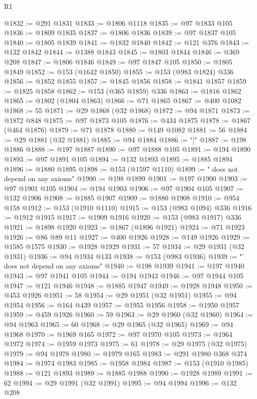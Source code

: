 \begin{lexlean}{R1}
\begin{coremodule}
@1832 := @291 @1831
@1833 := @1806 @1118
@1835 := @97 @1833 @105
@1836 := @1809 @1835
@1837 := @1806 @1836
@1839 := @97 @1837 @105
@1840 := @1805 @1839
@1841 := @1832 @1840
@1842 := @121 @376
@1843 := @132 @1842
@1844 := @1388 @1843
@1845 := @1803 @1844
@1846 := @369 @208
@1847 := @1806 @1846
@1849 := @97 @1847 @105
@1850 := @1805 @1849
@1852 := @153 (@1642 @1850)
@1855 := @153 (@983 @1824) @336
@1856 := @1852 @1855
@1857 := @1845 @1856
@1858 := @1841 @1857
@1859 := @1825 @1858
@1862 := @153 (@365 @1859) @336
@1863 := @1816 @1862
@1865 := @1802 (@1804 @1863)
@1866 := @71 @1865
@1867 := @400 @1082
@1868 := 55
@1871 := @29 @1868 (@32 @1868)
@1872 := @94 @1871
@1873 := @1872 @848
@1875 := @97 @1873 @105
@1876 := @434 @1875
@1878 := @1867 (@464 @1876)
@1879 := @71 @1878
@1880 := @149 @1082
@1881 := 56
@1884 := @29 @1881 (@32 @1881)
@1885 := @94 @1884
@1886 := "]"
@1887 := @198 @1886
@1888 := @197 @1887
@1890 := @97 @1888 @105
@1891 := @194 @1890
@1893 := @97 @1891 @105
@1894 := @132 @1893
@1895 := @1885 @1894
@1896 := @1880 @1895
@1898 := @153 (@1597 @1110)
@1899 := " does not depend on any axioms"
@1900 := @198 @1899
@1901 := @197 @1900
@1903 := @97 @1901 @105
@1904 := @194 @1903
@1906 := @97 @1904 @105
@1907 := @132 @1906
@1908 := @1885 @1907
@1909 := @1880 @1908
@1910 := @954 @158
@1912 := @153 (@1910 @1110)
@1915 := @153 (@983 @1094) @336
@1916 := @1912 @1915
@1917 := @1909 @1916
@1920 := @153 (@983 @1917) @336
@1921 := @1898 @1920
@1923 := @1867 (@1896 @1921)
@1924 := @71 @1923
@1926 := @86 @89 @11
@1927 := @400 @1926
@1928 := @149 @1926
@1929 := @1585 @1575
@1930 := @1928 @1929
@1931 := 57
@1934 := @29 @1931 (@32 @1931)
@1936 := @94 @1934 @133
@1938 := @153 (@983 @1936)
@1939 := "' does not depend on any axioms"
@1940 := @198 @1939
@1941 := @197 @1940
@1943 := @97 @1941 @105
@1944 := @194 @1943
@1946 := @97 @1944 @105
@1947 := @121 @1946
@1948 := @1885 @1947
@1949 := @1928 @1948
@1950 := @453 @1926
@1951 := 58
@1954 := @29 @1951 (@32 @1951)
@1955 := @94 @1954
@1956 := @164 @439
@1957 := @1955 @1956
@1958 := @1950 @1957
@1959 := @459 @1926
@1960 := 59
@1963 := @29 @1960 (@32 @1960)
@1964 := @94 @1963
@1965 := 60
@1968 := @29 @1965 (@32 @1965)
@1969 := @94 @1968
@1970 := @1969 @165
@1972 := @97 @1970 @105
@1973 := @1964 @1972
@1974 := @1959 @1973
@1975 := 61
@1978 := @29 @1975 (@32 @1975)
@1979 := @94 @1978
@1980 := @1979 @165
@1983 := @291 @1980 @368 @374
@1984 := @1974 @1983
@1985 := @1958 @1984
@1987 := @153 (@1910 @1985)
@1988 := @121 @1893
@1989 := @1885 @1988
@1990 := @1928 @1989
@1991 := 62
@1994 := @29 @1991 (@32 @1991)
@1995 := @94 @1994
@1996 := @132 @208

\end{coremodule}
\end{lexlean}
